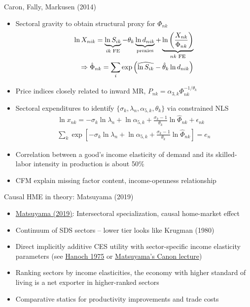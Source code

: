 \documentclass[10pt,notes=hide]{beamer}
\begin{document}
\begin{frame}{Caron, Fally, Markusen (2014)}
\linespread{1.0}
\begin{itemize}
	\item Sectoral gravity to obtain structural proxy for $\Phi_{nk}$
	\begin{align*}
	\ln X_{nik} = \underbrace{\ln S_{ik}}_{ik \textnormal{ FE}} - \theta_k \underbrace{\ln d_{nik}}_{\textnormal{proxies}} + \underbrace{\ln\left(\frac{X_{nk}}{\Phi_{nk}} \right)}_{nk \textnormal{ FE}} \\
	\Rightarrow \hat{\Phi}_{nk} = \sum_i \exp \left( \widehat{\ln S_{ik}} - \hat{\theta}_k \ln d_{nik} \right)
	\end{align*}
	\item Price indices closely related to inward MR, $P_{nk} = \alpha_{3,k} \Phi_{nk}^{-1/\theta_k}$
	\item Sectoral expenditures to identify $\{\sigma_k, \lambda_n, \alpha_{5,k}, \theta_k\}$ via constrained NLS
	\begin{align*}
	\ln x_{nk} = {-\sigma_k}\ln \lambda_n + \ln \alpha_{5,k} + \frac{\sigma_k-1}{\theta_k} \ln \hat{\Phi}_{nk} + \epsilon_{nk} \\
	\sum_k \exp \left[ {-\sigma_k}\ln \lambda_n + \ln \alpha_{5,k} + \frac{\sigma_k-1}{\theta_k} \ln \hat{\Phi}_{nk} \right] = e_n
	\end{align*}
	\item Correlation between a good's income elasticity of demand and its skilled-labor intensity in production is about 50\%
	\item CFM explain missing factor content, income-openness relationship
\end{itemize}
\end{frame}
\begin{frame}{Causal HME in theory: Matsuyama (2019)}
\begin{itemize}
	\item \href{https://onlinelibrary-wiley-com.proxy.uchicago.edu/doi/10.3982/ECTA13765}{Matsuyama (2019)}: Intersectoral specialization, causal home-market effect
	\item Continuum of SDS sectors -- lower tier looks like Krugman (1980)
	\item Direct implicitly additive CES utility with sector-specific income elasticity parameters (see \href{https://ideas.repec.org/a/ecm/emetrp/v43y1975i3p395-419.html}{Hanoch 1975} or \href{http://faculty.wcas.northwestern.edu/~kmatsu/}{Matsuyama's Canon lecture})
	\item Ranking sectors by income elasticities, the economy with higher standard of living is a net exporter in higher-ranked sectors
	\item Comparative statics for productivity improvements and trade costs
\end{itemize}
\end{frame}
\end{document}
